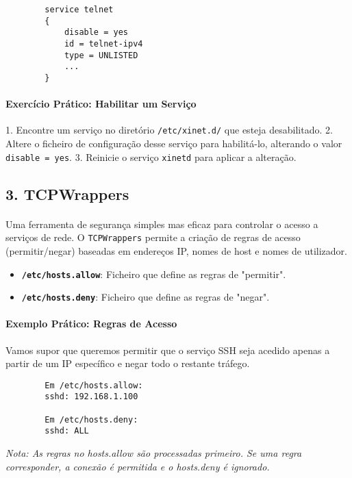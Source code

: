 \documentclass[10pt,a4paper]{article}
\begin{document}
	\begin{verbatim}
		service telnet
		{
			disable = yes
			id = telnet-ipv4
			type = UNLISTED
			...
		}
	\end{verbatim}
	
	\paragraph{\bfseries Exercício Prático: Habilitar um Serviço}
	1. Encontre um serviço no diretório \texttt{/etc/xinet.d/} que esteja desabilitado.
	2. Altere o ficheiro de configuração desse serviço para habilitá-lo, alterando o valor \texttt{disable = yes}.
	3. Reinicie o serviço \texttt{xinetd} para aplicar a alteração.
	
	\subsection*{3. TCPWrappers}
	\vspace{-1.2em}
	\paragraph{}
	Uma ferramenta de segurança simples mas eficaz para controlar o acesso a serviços de rede. O \texttt{TCPWrappers} permite a criação de regras de acesso (permitir/negar) baseadas em endereços IP, nomes de host e nomes de utilizador.
	
	\begin{itemize}
		\item \textbf{\texttt{/etc/hosts.allow}}: Ficheiro que define as regras de "permitir".
		\item \textbf{\texttt{/etc/hosts.deny}}: Ficheiro que define as regras de "negar".
	\end{itemize}
	
	\paragraph{\bfseries Exemplo Prático: Regras de Acesso}
	Vamos supor que queremos permitir que o serviço SSH seja acedido apenas a partir de um IP específico e negar todo o restante tráfego.
	
	\begin{verbatim}
		Em /etc/hosts.allow:
		sshd: 192.168.1.100
		
		Em /etc/hosts.deny:
		sshd: ALL
	\end{verbatim}
	
	\textit{Nota: As regras no hosts.allow são processadas primeiro. Se uma regra corresponder, a conexão é permitida e o hosts.deny é ignorado.}
	
\end{document}
